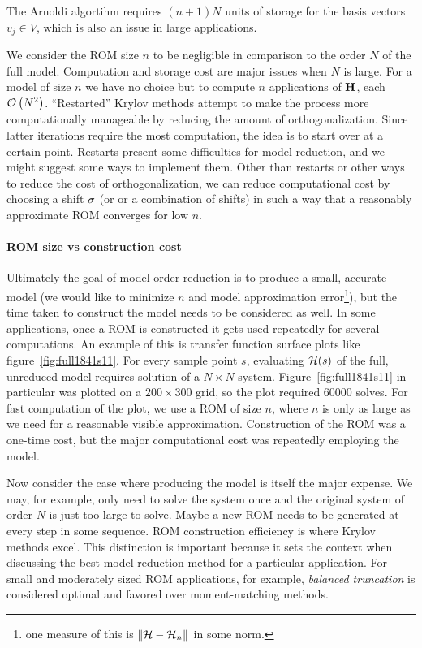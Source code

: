  The Arnoldi algortihm requires $(n+1)N$ units of storage for the basis vectors $v_j\in V$, which is also an issue in large applications. 
  
We consider the ROM size $n$ to be negligible in comparison to the order $N$ of the full model.  Computation and storage cost are major issues when $N$ is large.  For a model of size $n$ we have no choice but to compute $n$ applications of $\textbf{\textup{H}}$, each $\mathcal{O}\left( N^2 \right)$.  ``Restarted''  Krylov methods attempt to make the process more computationally manageable by reducing the  amount of orthogonalization.  Since latter iterations require the most computation, the idea is to start over at a certain point.  Restarts present some difficulties for model reduction, and we might suggest some ways to implement them.  Other than restarts or other ways to reduce the cost of orthogonalization, we can reduce computational cost by choosing a shift $\sigma$ (or or a combination of shifts) in such a way that a reasonably approximate  ROM converges for low $n$.    


\paragraph{ROM size vs construction cost}
Ultimately the goal of model order reduction is to produce a small, accurate model (we would like to minimize $n$ and model approximation error\footnote{one measure of this is $\left\| \mathcal{H} -\mathcal{H}_n \right\|_{}$ in some norm.}), but the time taken to construct the model needs to be considered as well.  In some applications, once a ROM is constructed it gets used repeatedly for several computations.  An example of this is transfer function surface plots like figure~\ref{fig:full1841s11}.  For every sample point $s$, evaluating $\mathcal{H}(s)$ of the full, unreduced model requires solution of a $N\times N$ system.      Figure~\ref{fig:full1841s11} in particular was plotted on a $200\times 300$ grid, so the plot required 60000 solves.  For fast computation of the plot, we use a ROM of size $n$, where $n$ is only as large as we need for a reasonable visible approximation.   Construction of the ROM was a one-time cost, but the major computational cost was repeatedly employing the model.  

Now consider the case where producing the model is itself the major expense.  We may, for example, only need to solve the system once and the original system of order $N$ is just too large to solve.  Maybe a new ROM needs to be generated at every step in some sequence.   ROM construction efficiency is where Krylov methods excel.   This distinction is important because it sets the context when discussing the best model reduction method for a particular application.  For small and moderately sized ROM applications, for example, \emph{balanced truncation} is considered optimal and favored over moment-matching methods.  
  
